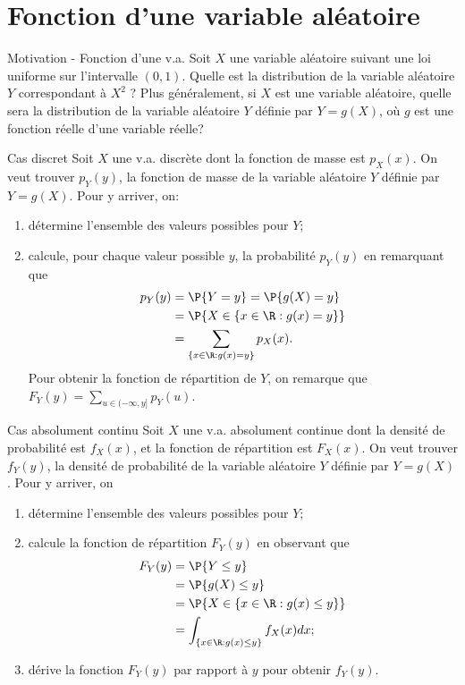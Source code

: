 \documentclass[nuit,charter,pied]{BeamerJS}
\begin{document}
\section[Fonction d'une v.a.]{Fonction d'une variable aléatoire}
\begin{frame}{Motivation - Fonction d'une v.a.}
	Soit $X$ une variable aléatoire suivant une loi uniforme sur l'intervalle $(0,1)$. Quelle est la distribution de la variable aléatoire $Y$ correspondant à $X^2$ ? Plus généralement, si $X$ est une variable aléatoire, quelle sera la distribution de la variable aléatoire $Y$ définie par $Y=g(X)$, où $g$ est une fonction réelle d'une variable réelle?
\end{frame}
\begin{frame}{Cas discret}
	\small
	Soit $X$ une v.a. discrète dont la fonction de masse est $p_X(x)$. On veut trouver $p_Y(y)$, la fonction de masse de la variable aléatoire $Y$ définie par $Y=g(X)$. Pour y arriver, on:
	\begin{enumerate}
		\item détermine l'ensemble des valeurs possibles pour $Y$;
		\item calcule, pour chaque valeur possible $y$, la probabilité $p_Y(y)$ en remarquant que
		\begin{align*}
			p_Y(y)&=\P{Y=y}=\P{g(X)=y}\\
			&=\P{X\in\{x\in\R:g(x)=y\}}\\
			&=\sum_{\{x\in\R:g(x)=y\}}p_{X}(x).\
		\end{align*}
		Pour obtenir la fonction de répartition de $Y$, on remarque que $F_{Y}(y)=\sum_{u\in(-\infty,y]}p_{Y}(u)$.
	\end{enumerate}
\end{frame}
\begin{frame}{Cas absolument continu}
	Soit $X$ une v.a. absolument continue dont la densité de probabilité est $f_X(x)$, et la fonction de répartition est $F_X(x)$. On veut trouver $f_Y(y)$, la densité de probabilité de la variable aléatoire $Y$ définie par $Y=g(X)$. Pour y arriver, on
	\begin{enumerate}
		\item détermine l'ensemble des valeurs possibles pour $Y$;
		\item calcule la fonction de répartition $F_Y(y)$ en observant que
		\begin{align*}
			F_Y(y)&=\P{Y\leq y}\\
			&=\P{g(X)\leq y}\\
			&=\P{X\in\{x\in\R:g(x)\leq y\}}\\
			&=\int_{\{x\in\R:g(x)\leq y\}}f_{X}(x)dx;\
		\end{align*}
		\item dérive la fonction $F_Y(y)$ par rapport à $y$ pour obtenir $f_Y(y)$.\
	\end{enumerate}
\end{frame}
\end{document}

